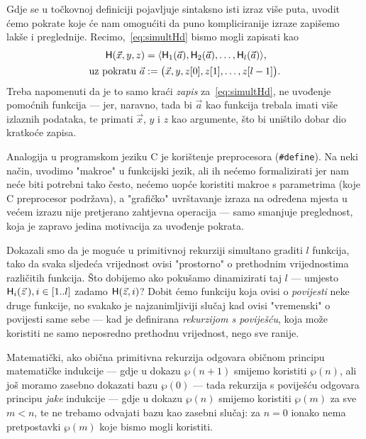 \begin{napomena}
Gdje se u točkovnoj definiciji pojavljuje sintaksno isti izraz više puta, uvodit ćemo pokrate koje će nam omogućiti da puno kompliciranije izraze zapišemo lakše i preglednije. Recimo,~\eqref{eq:simultHd} bismo mogli zapisati kao
\begin{align}
    \mathsf H(\vec x,y,z)&=\langle \mathsf H_1(\vec a),\mathsf H_2(\vec a),\dotsc,\mathsf H_l(\vec a)\rangle\text,\\
    \text{uz pokratu } \vec a&:=\bigl(\vec x,y,z[0],z[1],\dotsc,z[l-1]\bigr)\text.
\end{align}
Treba napomenuti da je to samo kraći \emph{zapis} za~\eqref{eq:simultHd}, ne uvođenje pomoćnih funkcija --- jer, naravno, tada bi $\vec a$ kao funkcija trebala imati više izlaznih podataka, te primati $\vec x$, $y$ i $z$ kao argumente, što bi uništilo dobar dio kratkoće zapisa.

Analogija u programskom jeziku C je korištenje preprocesora (\verb+#define+). Na neki način, uvodimo "makroe" u funkcijski jezik, ali ih nećemo formalizirati jer nam neće biti potrebni tako često, nećemo uopće koristiti makroe s parametrima (koje C preprocesor podržava), a "grafičko" uvrštavanje izraza na određena mjesta u većem izrazu nije pretjerano zahtjevna operacija --- samo smanjuje preglednost, koja je zapravo jedina motivacija za uvođenje pokrata.
\end{napomena}

Dokazali smo da je moguće u primitivnoj rekurziji simultano graditi $l$ funkcija, tako da svaka sljedeća vrijednost ovisi "prostorno" o prethodnim vrijednostima različitih funkcija. Što dobijemo ako pokušamo dinamizirati taj $l$ --- umjesto $\mathsf H_i(\vec z\,),i\in[1..l]$ zadamo $\mathsf H(\vec z,i)$? Dobit ćemo funkciju koja ovisi o \emph{povijesti} neke druge funkcije, no svakako je najzanimljiviji slučaj kad ovisi "vremenski" o povijesti same sebe --- kad je definirana \emph{rekurzijom s poviješću}, koja može koristiti ne samo neposredno prethodnu vrijednost, nego sve ranije.

Matematički, ako obična primitivna rekurzija odgovara običnom principu matematičke indukcije --- gdje u dokazu $\wp(n+1)$ smijemo koristiti $\wp(n)$, ali još moramo zasebno dokazati bazu $\wp(0)$ --- tada rekurzija s poviješću odgovara principu \emph{jake} indukcije --- gdje u dokazu $\wp(n)$ smijemo koristiti $\wp(m)$ za sve $m<n$, te ne trebamo odvajati bazu kao zasebni slučaj: za $n=0$ ionako nema pretpostavki $\wp(m)$ koje bismo mogli koristiti.

